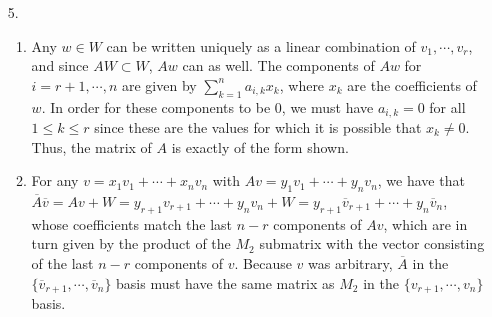 \documentclass[12pt]{article}
\begin{document}
\begin{enumerate}
    \item[5.]
        \begin{enumerate}
            \item
                Any $w \in W$ can be written uniquely as a linear combination of $v_1, \cdots, v_r$, and since $AW \subset W$, $Aw$ can as well. The components of $Aw$ for $i = r + 1, \cdots, n$ are given by $\sum_{k = 1}^n a_{i, k} x_k$, where $x_k$ are the coefficients of $w$. In order for these components to be $0$, we must have $a_{i, k} = 0$ for all $1 \leq k \leq r$ since these are the values for which it is possible that $x_k \neq 0$. Thus, the matrix of $A$ is exactly of the form shown.
            \item
                For any $v = x_1 v_1 + \cdots + x_n v_n$ with $Av = y_1 v_1 + \cdots + y_n v_n$, we have that $\overline{A}\overline{v} = Av + W = y_{r + 1} v_{r + 1} + \cdots + y_n v_n + W = y_{r + 1} \overline{v}_{r + 1} + \cdots + y_n \overline{v}_n$, whose coefficients match the last $n - r$ components of $Av$, which are in turn given by the product of the $M_2$ submatrix with the vector consisting of the last $n - r$ components of $v$. Because $v$ was arbitrary, $\overline{A}$ in the $\{ \overline{v}_{r + 1}, \cdots, \overline{v}_n \}$ basis must have the same matrix as $M_2$ in the $\{ v_{r + 1}, \cdots, v_n \}$ basis.
        \end{enumerate}
\end{enumerate}
\end{document}
